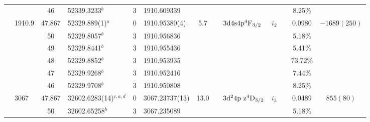 \begin{table*}
\begin{center}
{\begin{tabular}{:l;l;c;l;c;l;c;l;l;c;c;c;c}
\rowstyle{\itshape}               &        & 46        & 52339.3233$^{b}$                 & 3 &   1910.609339      &      & $                                        $ & $                                        $ & $      $ &              & 8.25\%    & $          $\\
                                  & 1910.9 & 47.867    & 52329.889(1)$^{a}$               & 0 &    1910.95380(4)   &  5.7 & $                                        $ & $3\rm{d}4\rm{s}4\rm{p}^4\rm{F}_{3/2}     $ & $i_{2} $ &              & 0.0980    & $-1689(250)$\\
\rowstyle{\itshape}               &        & 50        & 52329.8057$^{b}$                 & 3 &   1910.956836      &      & $                                        $ & $                                        $ & $      $ &              & 5.18\%    & $          $\\
\rowstyle{\itshape}               &        & 49        & 52329.8441$^{b}$                 & 3 &   1910.955436      &      & $                                        $ & $                                        $ & $      $ &              & 5.41\%    & $          $\\
\rowstyle{\itshape}               &        & 48        & 52329.8852$^{b}$                 & 3 &   1910.953935      &      & $                                        $ & $                                        $ & $      $ &              & 73.72\%   & $          $\\
\rowstyle{\itshape}               &        & 47        & 52329.9268$^{b}$                 & 3 &   1910.952416      &      & $                                        $ & $                                        $ & $      $ &              & 7.44\%    & $          $\\
\rowstyle{\itshape}               &        & 46        & 52329.9708$^{b}$                 & 3 &   1910.950808      &      & $                                        $ & $                                        $ & $      $ &              & 8.25\%    & $          $\\
                                  & 3067   & 47.867    & 32602.6283(14)$^{c,a,d}$         & 0 &    3067.23737(13)  & 13.0 & $                                        $ & $3\rm{d}^24\rm{p~z}^4\rm{D}_{3/2}        $ & $i_{3} $ &              & 0.0489    & $  855(80) $\\
\rowstyle{\itshape}               &        & 50        & 32602.65258$^{b}$                & 3 &   3067.235089      &      & $                                        $ & $                                        $ & $      $ &              & 5.18\%    & $          $\\

\end{tabular}}
\end{center}
\end{table*}
